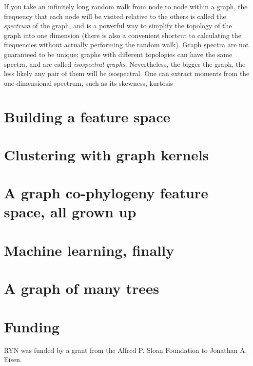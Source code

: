 \documentclass[
10pt, %
a4paper, %
oneside, %
headinclude,footinclude, %
BCOR5mm, %
]{scrartcl}
\begin{document}
If you take an infinitely long random walk from node to node within a graph, the frequency that each node will be visited relative to the others is called the {\em spectrum} of the graph, and is a powerful way to simplify the topology of the graph into one dimension (there is also a convenient shortcut to calculating the frequencies without actually performing the random walk). Graph spectra are not guaranteed to be unique; graphs with different topologies can have the same spectra, and are called {\em isospectral graphs}. Nevertheless, the bigger the graph, the less likely any pair of them will be isospectral. One can extract moments from the one-dimensional spectrum, such as its skewness, kurtosis 

\section{Building a feature space}

\section{Clustering with graph kernels}

\section{A graph co-phylogeny feature space, all grown up}

\section{Machine learning, finally}

\section{A graph of many trees}



\section{Funding}

RYN was funded by a grant from the Alfred P. Sloan Foundation to Jonathan A. Eisen.

\printbibliography[heading=subbibliography]

\clearpage


\end{document}
